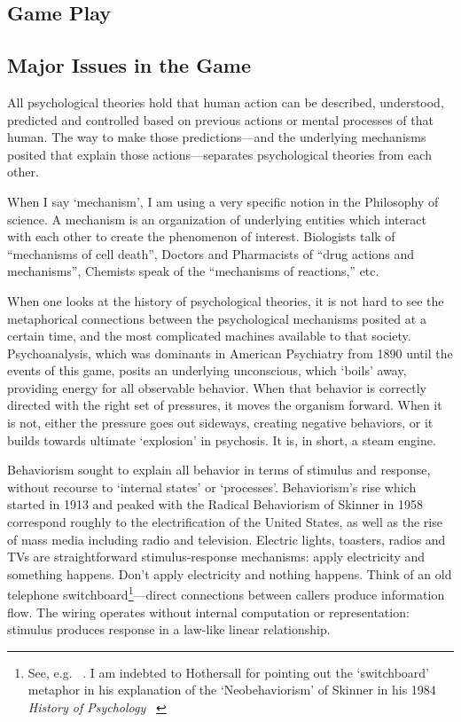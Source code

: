 \begin{refsection}
\pagebreak 

\chapter{Game Play}
\label{gameplay}

\section{Major Issues in the Game}
\label{majorissuesinthegame}

All psychological theories hold that human action can be described, understood, predicted and controlled based on previous actions or mental processes of that human. The way to make those predictions---and the underlying mechanisms posited that explain those actions---separates psychological theories from each other.

When I say ‘mechanism’, I am using a very specific notion in the Philosophy of science. A mechanism is an organization of underlying entities which interact with each other to create the phenomenon of interest. Biologists talk of “mechanisms of cell death”, Doctors and Pharmacists of “drug actions and mechanisms”, Chemists speak of the “mechanisms of reactions,” etc. 

When one looks at the history of psychological theories, it is not hard to see the metaphorical connections between the psychological mechanisms posited at a certain time, and the most complicated machines available to that society. Psychoanalysis, which was dominants in American Psychiatry from 1890 until the events of this game, posits an underlying unconscious, which ‘boils’ away, providing energy for all observable behavior. When that behavior is correctly directed with the right set of pressures, it moves the organism forward. When it is not, either the pressure goes out sideways, creating negative behaviors, or it builds towards ultimate ‘explosion’ in psychosis. It is, in short, a steam engine.

Behaviorism sought to explain all behavior in terms of stimulus and response, without recourse to ‘internal states’ or ‘processes’. Behaviorism’s rise which started in 1913 and peaked with the Radical Behaviorism of Skinner in 1958 correspond roughly to the electrification of the United States, as well as the rise of mass media including radio and television. Electric lights, toasters, radios and TVs are straightforward stimulus-response mechanisms: apply electricity and something happens. Don’t apply electricity and nothing happens. Think of an old telephone switchboard\footnote{See, e.g. ~\citep{Spence:1950fx}. I am indebted to Hothersall for pointing out the ‘switchboard’ metaphor in his explanation of the ‘Neobehaviorism’ of Skinner in his 1984 \emph{History of Psychology} ~\citep[p. 411]{Hothersall:1984te}}---direct connections between callers produce information flow. The wiring operates without internal computation or representation: stimulus produces response in a law-like linear relationship. 


\end{refsection}

